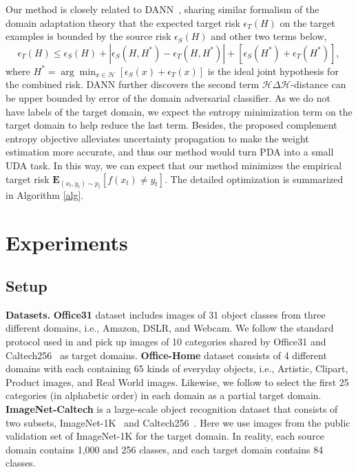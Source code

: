 \documentclass[runningheads]{llncs}
\begin{document}
Our method is closely related to DANN~\cite{ganin2015unsupervised}, sharing similar formalism of the domain adaptation theory \cite{ben2010theory} that the expected target risk $\epsilon_{T}(H)$ on the target examples is bounded by the source risk $\epsilon_{S}(H)$ and other two terms below, 
	\begin{equation}
	\epsilon_{T}(H) \leq \epsilon_{S}(H) + |\epsilon_{S}(H,H^*) - \epsilon_{T}(H,H^*)| + [\epsilon_{S}(H^*) + \epsilon_{T}(H^*)], 
	\label{eq:theory}
	\end{equation}
where $H^* = \arg\min\nolimits_{x\in \mathcal{H}} [\epsilon_{S}(x) + \epsilon_{T}(x)]$ is the ideal joint hypothesis for the combined risk.
DANN further discovers the second term $\mathcal{H}\Delta\mathcal{H}$-distance can be upper bounded by error of the domain adversarial classifier.
As we do not have labels of the target domain, we expect the entropy minimization term on the target domain to help reduce the last term.
Besides, the proposed complement entropy objective alleviates uncertainty propagation to make the weight estimation more accurate, and thus our method would turn PDA into a small UDA task.
In this way, we can expect that our method minimizes the empirical target risk $\textbf{E}_{(x_t,y_t)\sim p_t}[f(x_t)\not = y_t]$.
The detailed optimization is summarized in Algorithm \ref{alg}.


\section{Experiments}
\subsection{Setup}
\textbf{Datasets.} \textbf{Office31} dataset \cite{saenko2010adapting} includes images of 31 object classes from three different domains, i.e., Amazon, DSLR, and Webcam. We follow the standard protocol used in \cite{cao2018partial} and pick up images of 10 categories shared by Office31 and Caltech256~\cite{griffin2007caltech} as target domains. \textbf{Office-Home} dataset  \cite{venkateswara2017deep}  consists of 4 different domains with each containing 65 kinds of everyday objects, i.e., Artistic, Clipart, Product images, and Real World images. Likewise, we follow \cite{cao2018partial} to select the first 25 categories (in alphabetic order) in each domain as a partial target domain. 
\textbf{ImageNet-Caltech} is a large-scale object recognition dataset that consists of two subsets, ImageNet-1K~\cite{russakovsky2015imagenet} and Caltech256~\cite{griffin2007caltech}.
Here we use images from the public validation set of ImageNet-1K for the target domain. 
In reality, each source domain contains 1,000 and 256 classes, and each target domain contains 84 classes.
	
\end{document}

